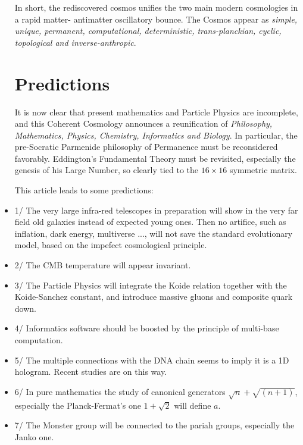 \documentclass[twoside,draft]{article}
\begin{document}
\begin{sloppypar}
\begin{itemize}
In short, the rediscovered cosmos unifies the two main modern cosmologies in a rapid matter-
antimatter oscillatory bounce. The Cosmos appear as \textit{simple, unique, permanent, computational,
deterministic, trans-planckian, cyclic, topological and inverse-anthropic}.

\section{Predictions}

It is now clear that present mathematics and Particle Physics are incomplete, and this Coherent Cosmology announces a reunification of \textit{Philosophy, Mathematics, Physics, Chemistry, Informatics and Biology}. In particular, the pre-Socratic Parmenide philosophy of Permanence must be reconsidered favorably. Eddington's Fundamental Theory must be revisited, especially the genesis of his Large Number, so clearly tied to the $16 \times 16$ symmetric matrix.

      This article leads to some predictions:
\item 1/  The very large infra-red telescopes in preparation will show in the very far field old galaxies instead of expected young ones. Then no artifice, such as inflation, dark energy, multiverse ..., will not save the standard evolutionary model, based on the impefect cosmological principle.
\item 2/ The CMB temperature will appear invariant. 
\item 3/ The Particle Physics will integrate the Koide relation together with the Koide-Sanchez constant, and introduce massive gluons and composite quark down.
\item 4/ Informatics software should be boosted by the principle of multi-base computation.
\item 5/ The multiple connections with the DNA chain seems to imply it is a 1D hologram. Recent studies \cite{Widom} are on this way.
\item 6/ In pure mathematics the study of canonical generators $\sqrt{n}+\sqrt{(n+1)}$, especially the Planck-Fermat's one $1+\sqrt2$ will define $a$.
\item 7/ The Monster group will be connected to the pariah groups, especially the Janko one.
\end{itemize}



\end{sloppypar}
\end{document}
